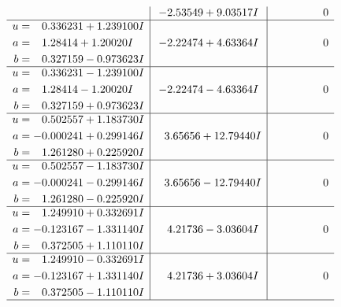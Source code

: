 \documentclass[1p]{elsarticle_modified}
\theoremstyle{definition}
\begin{document}
$$\begin{array}{c|c|c}
 & -2.53549 + 9.03517 I & \phantom{-0.000000 } 0 \\ \hline\begin{aligned}
u &= \phantom{-}0.336231 + 1.239100 I \\
a &= \phantom{-}1.28414 + 1.20020 I \\
b &= \phantom{-}0.327159 - 0.973623 I\end{aligned}
 & -2.22474 + 4.63364 I & \phantom{-0.000000 } 0 \\ \hline\begin{aligned}
u &= \phantom{-}0.336231 - 1.239100 I \\
a &= \phantom{-}1.28414 - 1.20020 I \\
b &= \phantom{-}0.327159 + 0.973623 I\end{aligned}
 & -2.22474 - 4.63364 I & \phantom{-0.000000 } 0 \\ \hline\begin{aligned}
u &= \phantom{-}0.502557 + 1.183730 I \\
a &= -0.000241 + 0.299146 I \\
b &= \phantom{-}1.261280 + 0.225920 I\end{aligned}
 & \phantom{-}3.65656 + 12.79440 I & \phantom{-0.000000 } 0 \\ \hline\begin{aligned}
u &= \phantom{-}0.502557 - 1.183730 I \\
a &= -0.000241 - 0.299146 I \\
b &= \phantom{-}1.261280 - 0.225920 I\end{aligned}
 & \phantom{-}3.65656 - 12.79440 I & \phantom{-0.000000 } 0 \\ \hline\begin{aligned}
u &= \phantom{-}1.249910 + 0.332691 I \\
a &= -0.123167 - 1.331140 I \\
b &= \phantom{-}0.372505 + 1.110110 I\end{aligned}
 & \phantom{-}4.21736 - 3.03604 I & \phantom{-0.000000 } 0 \\ \hline\begin{aligned}
u &= \phantom{-}1.249910 - 0.332691 I \\
a &= -0.123167 + 1.331140 I \\
b &= \phantom{-}0.372505 - 1.110110 I\end{aligned}
 & \phantom{-}4.21736 + 3.03604 I & \phantom{-0.000000 } 0\\
 \hline 
 \end{array}$$\newpage$$\begin{array}{c|c|c}  

\end{array}$$
\end{document}

